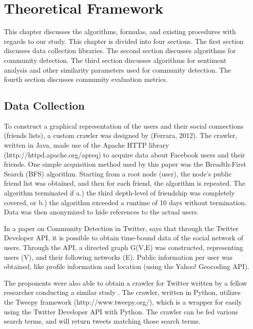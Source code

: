 %
%
%                 


\chapter{Theoretical Framework}
\label{sec:theoframe}


This chapter discusses the algorithms, formulas, and existing procedures with regards to our study. This chapter is divided into four sections. The first section discusses data collection libraries. The second section discusses algorithms for community detection. The third section discusses algorithms for sentiment analysis and other similarity parameters used for community detection. The fourth section discusses community evaluation metrics.


\section{Data Collection}


To construct a graphical representation of the users and their social connections (friends lists), a custom crawler was designed by (Ferrara, 2012). The crawler, written in Java, made use of the Apache HTTP library (http://httpd.apache.org/apreq) to acquire data about Facebook users and their friends. One simple acquisition method used by this paper was the Breadth-First Search (BFS) algorithm. Starting from a root node (user), the node’s public friend list was obtained, and then for each friend, the algorithm is repeated. The algorithm terminated if a.) the third depth-level of friendship was completely covered, or b.) the algorithm exceeded a runtime of 10 days without termination. Data was then anonymized to hide references to the actual users.

In a paper on Community Detection in Twitter,  says that through the Twitter Developer API, it is possible to obtain time-bound data of the social network of users. Through the API, a directed graph G(V,E) was constructed, representing users (V), and their following networks (E). Public information per user was obtained, like profile information and location (using the Yahoo! Geocoding API).

The proponents were also able to obtain a crawler for Twitter written by a fellow researcher conducting a similar study \cite{Lam:2016}. The crawler, written in Python, utilizes the Tweepy framework (http://www.tweepy.org/), which is a wrapper for easily using the Twitter Developer API with Python. The crawler can be fed various search terms, and will return tweets matching those search terms.

